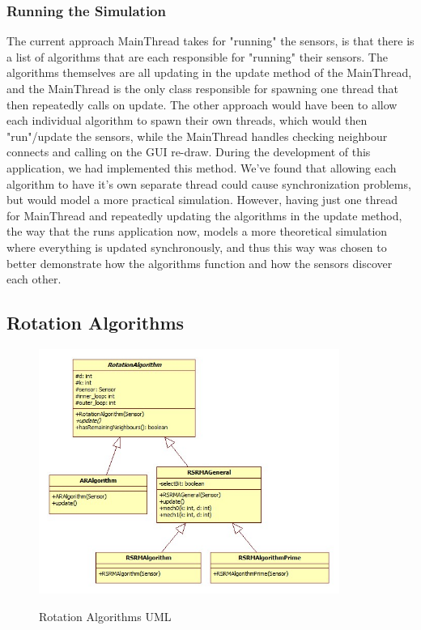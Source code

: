 \subsubsection{Running the Simulation}

The current approach MainThread takes for "running" the sensors, is that there is a list of 
algorithms that are each responsible for "running" their sensors. The algorithms themselves 
are all updating in the update method of the MainThread, and the MainThread is the only class 
responsible for spawning one thread that then repeatedly calls on update. The other approach 
would have been to allow each individual algorithm to spawn their own threads, which would 
then "run"/update the sensors, while the MainThread handles checking neighbour connects and 
calling on the GUI re-draw. During the development of this application, we had implemented 
this method. We've found that allowing each algorithm to have it's own separate thread could 
cause synchronization problems, but would model a more practical simulation. However, having 
just one thread for MainThread and repeatedly updating the algorithms in the update method, 
the way that the runs application now, models a more theoretical simulation where everything 
is updated synchronously, and thus this way was chosen to better demonstrate how the 
algorithms function and how the sensors discover each other.


\subsection{Rotation Algorithms}

\begin{figure}[ht]
\centering
\caption{Rotation Algorithms UML}
\includegraphics[height = 8cm]{pics/algo.jpg}\\[0.5cm]    
\label{fig:rotalgo}
\end{figure}

